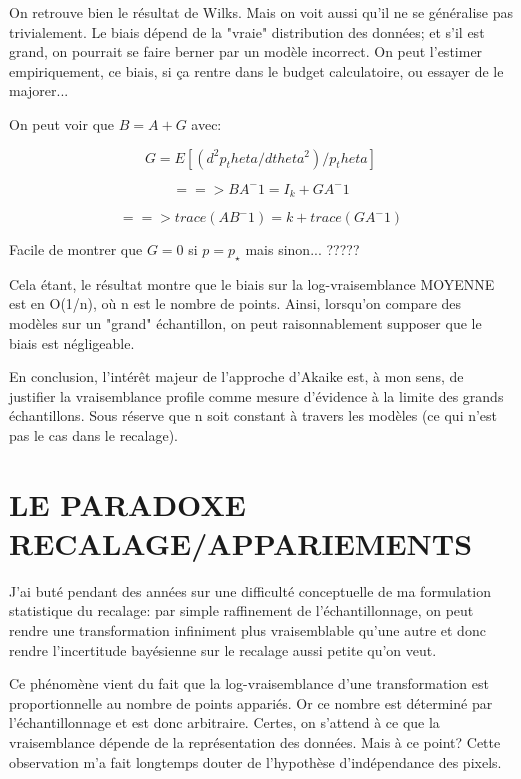 \documentclass{article}
\begin{document}
On retrouve bien le r\'esultat de Wilks. Mais on voit aussi qu'il ne se g\'en\'eralise pas trivialement. Le biais d\'epend de la "vraie" distribution des donn\'ees; et s'il est grand, on pourrait se faire berner par un mod\`ele incorrect. On peut l'estimer empiriquement, ce biais, si \c{c}a rentre dans le budget calculatoire, ou essayer de le majorer... 

On peut voir que $B = A + G$ avec: 

$$G = E[(d^2 p_theta / dtheta^2) / p_theta]$$ 

$$==> B A^-1 = I_k + G A^-1$$ 

$$==> trace(A B^-1) = k + trace(G A^-1)$$ 

Facile de montrer que $G=0$ si $p=p_\star$ mais sinon... ????? 

Cela \'etant, le r\'esultat montre que le biais sur la log-vraisemblance MOYENNE est en O(1/n), o\`u n est le nombre de points. Ainsi, lorsqu'on compare des mod\`eles sur un "grand" \'echantillon, on peut raisonnablement supposer que le biais est n\'egligeable. 

En conclusion, l'int\'er\^et majeur de l'approche d'Akaike est, \`a mon sens, de justifier la vraisemblance profile comme mesure d'\'evidence \`a la limite des grands \'echantillons. Sous r\'eserve que n soit constant \`a travers les mod\`eles (ce qui n'est pas le cas dans le recalage). 





\section{LE PARADOXE RECALAGE/APPARIEMENTS}


J'ai but\'e pendant des ann\'ees sur une difficult\'e conceptuelle de ma formulation statistique du recalage: par simple raffinement de l'\'echantillonnage, on peut rendre une transformation infiniment plus vraisemblable qu'une autre et donc rendre l'incertitude bay\'esienne sur le recalage aussi petite qu'on veut. 

Ce ph\'enom\`ene vient du fait que la log-vraisemblance d'une transformation est proportionnelle au nombre de points appari\'es. Or ce nombre est d\'etermin\'e par l'\'echantillonnage et est donc arbitraire. Certes, on s'attend \`a ce que la vraisemblance d\'epende de la repr\'esentation des donn\'ees. Mais \`a ce point? Cette observation m'a fait longtemps douter de l'hypoth\`ese d'ind\'ependance des pixels. 
\end{document}
